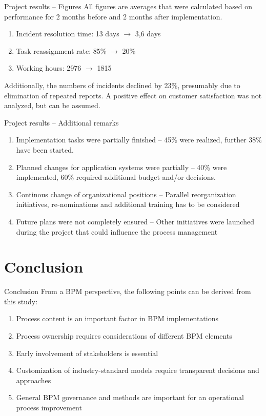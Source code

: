 \documentclass{beamer}
\begin{document}
\begin{frame}{Project results -- Figures}
    All figures are averages that were calculated based on performance for 2 months before and 2 months after implementation.
    \begin{enumerate}[$\circ$]
        \item Incident resolution time: 13 days $\rightarrow$ 3,6 days
        \item Task reassignment rate: 85\% $\rightarrow$ 20\%
        \item Working hours: 2976 $\rightarrow$  1815
    \end{enumerate}
    Additionally, the numbers of incidents declined by 23\%, presumably due to elimination of repeated reports.
    A positive effect on customer satisfaction was not analyzed, but can be assumed.
\end{frame}

\begin{frame}{Project results -- Additional remarks}
    \begin{enumerate}[$\circ$]
        \item Implementation tasks were partially finished -- 45\% were realized, further 38\% have been started.
        \item Planned changes for application systems were partially -- 40\% were implemented, 60\% required additional budget and/or decisions.
        \item Continous change of organizational positions -- Parallel reorganization initiatives, re-nominations and additional training has to be considered
        \item Future plans were not completely ensured -- Other initiatives were launched during the project that could influence the process management
    \end{enumerate}
\end{frame}

\section{Conclusion}
\begin{frame}{Conclusion}
    From a BPM perspective, the following points can be derived from this study:
    \begin{enumerate}[$\circ$]
        \item Process content is an important factor in BPM implementations
        \item Process ownership requires considerations of different BPM elements
        \item Early involvement of stakeholders is essential
        \item Customization of industry-standard models require transparent decisions and approaches
        \item General BPM governance and methods are important for an operational process improvement
    \end{enumerate}
\end{frame}
\end{document}
